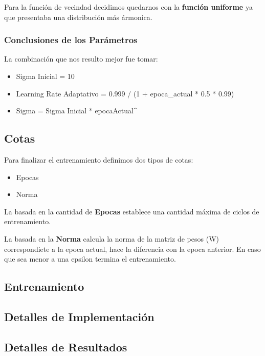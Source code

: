 Para la función de vecindad decidimos quedarnos con la \textbf{función uniforme} ya
que presentaba una distribución más ármonica.

\subsubsection{Conclusiones de los Parámetros}

La combinación que nos resulto mejor fue tomar:


\begin{itemize}
	\item Sigma Inicial = 10
	\item Learning Rate Adaptativo = 0.999 / (1 + epoca_actual * 0.5 * 0.99)
	\item Sigma = Sigma Inicial * {epocaActual^}
\end{itemize}


\subsection{Cotas}

Para finalizar el entrenamiento definimos dos tipos de cotas:

\begin{itemize}
	\item Epocas
	\item Norma
\end{itemize}

La basada en la cantidad de \textbf{Epocas} establece una cantidad máxima de
ciclos de entrenamiento.

La basada en la \textbf{Norma} calcula la norma de la matriz de pesos (W) 
correspondiete a la epoca actual, hace la diferencia con la epoca anterior.
En caso que sea menor a una epsilon termina el entrenamiento.


\subsection{Entrenamiento}


\subsection{Detalles de Implementación}

\subsection{Detalles de Resultados}

